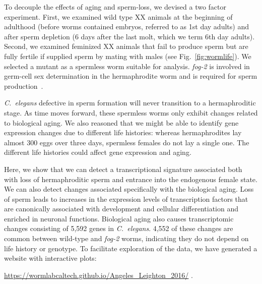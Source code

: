 \documentclass[10pt,letterpaper,twocolumn]{article}
\newcommand{\cel}{\emph{C.~elegans}}
\newcommand{\fog}{\emph{\mbox{fog-2}}}
\newcommand{\agen}{5,592}
\newcommand{\website}{
            \url{https://wormlabcaltech.github.io/Angeles_Leighton_2016/}
            }
\begin{document}
To decouple the effects of aging and sperm-loss, we devised a two factor
experiment. First, we examined wild type XX animals at the beginning of
adulthood (before worms contained embryos, referred to as 1st day adults) and
after sperm depletion (6 days after the last molt, which we term 6th day
adults). Second, we examined feminized XX animals that fail to produce sperm but
are fully fertile if supplied sperm by mating with males (see
Fig.~\ref{fig:wormlife}). We selected a mutant as a spermless worm suitable for
analysis. \fog{} is involved in germ-cell sex determination in the hermaphrodite
worm and is required for sperm production~\cite{Schedl1988,Clifford2000}.

\cel{} defective in sperm formation will never transition to a hermaphroditic
stage. As time moves forward, these spermless worms only exhibit changes
related to biological aging. We also reasoned that we might be able to identify
gene expression changes due to different life histories: whereas hermaphrodites
lay almost 300 eggs over three days, spermless females do not lay a single one.
The different life histories could affect gene expression and aging.

Here, we show that we can detect a transcriptional signature associated both
with loss of hermaphroditic sperm and entrance into the endogenous female state.
We can also detect changes associated specifically with the biological aging.
Loss of sperm leads to increases in the expression levels of transcription
factors that are canonically associated with development and cellular
differentiation and enriched in neuronal functions.
Biological aging also causes transcriptomic changes consisting of \agen{} genes
in \cel{}. 4,552 of these changes are common between wild-type and \fog{} worms,
indicating they do not depend on life history or genotype. To facilitate
exploration of the data, we have generated a website with interactive plots:
\website{}.
\end{document}
